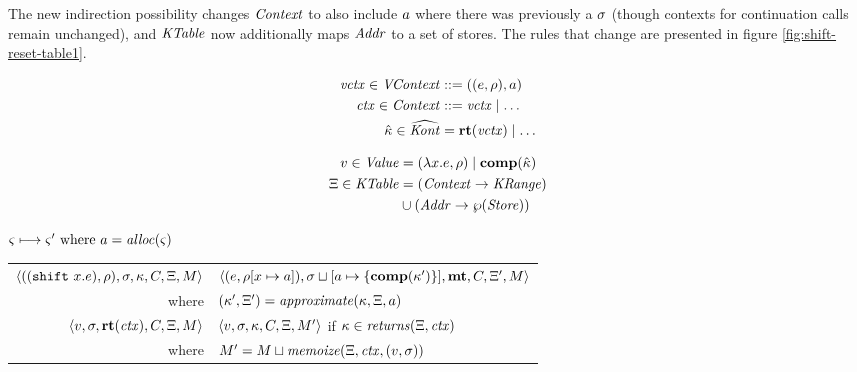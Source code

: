The new indirection possibility changes $\mathit{Context}$ to also include $a$ where there was previously a $\sigma$ (though contexts for continuation calls remain unchanged), and $\mathit{KTable}$ now additionally maps $\mathit{Addr}$ to a set of stores.
%
The rules that change are presented in figure \ref{fig:shift-reset-table1}.

{
\setlength{\abovedisplayskip}{0pt}
\setlength{\belowdisplayskip}{4pt}
\setlength{\abovedisplayshortskip}{0pt}
\setlength{\belowdisplayshortskip}{8pt}
\begin{minipage}{0.45\linewidth}
  \begin{align*}
    \mathit{vctx} \in \mathit{VContext} &::= ((e,\rho),a) \\
    \mathit{ctx} \in \mathit{Context} &::= \mathit{vctx} \mathrel{\mid} \ldots \\
    \hat{\kappa} \in \widehat{\mathit{Kont}} &= \mathbf{rt}(\mathit{vctx}) \mathrel{\mid} \ldots
  \end{align*}
\end{minipage}
\begin{minipage}{0.50\linewidth}
  \begin{align*}
    v \in \mathit{Value} &= (\lambda{} x. e, \rho) \mathrel{\mid} \mathbf{comp}(\hat{\kappa}) \\
    \Xi \in \mathit{KTable} &= (\mathit{Context} \to \mathit{KRange}) \\
    &\cup (\mathit{Addr} \to \wp(\mathit{Store}))
  \end{align*}
\end{minipage}

}

\begin{figure*}
  \centering
  $\varsigma \longmapsto \varsigma' \text{ where } a = \mathit{alloc}(\varsigma)$ \\
  \begin{tabular}{r|l}
    \hline
    $\langle ((\texttt{shift}\ x. e), \rho), \sigma, \kappa, C, \Xi, M \rangle$
    &
    $\langle (e, \rho[x \mapsto a]), \sigma\sqcup[a \mapsto \{ \mathbf{comp}(\kappa') \}],\mathbf{mt},C,\Xi',M \rangle$
    \\
    where & $(\kappa',\Xi') = \mathit{approximate}(\kappa, \Xi, a)$
\\
   $\langle v, \sigma, \mathbf{rt}(\mathit{ctx}), C, \Xi, M \rangle$
   &
   $\langle v, \sigma, \kappa, C, \Xi, M' \rangle$
   if $\kappa \in \mathit{returns}(\Xi, \mathit{ctx})$
   \\
   where & $M' = M \sqcup \mathit{memoize}(\Xi, \mathit{ctx}, (v, \sigma))$
  \end{tabular}
  \caption{Fixed table-based semantics for shift/reset}
  \label{fig:shift-reset-table1}
\end{figure*}

